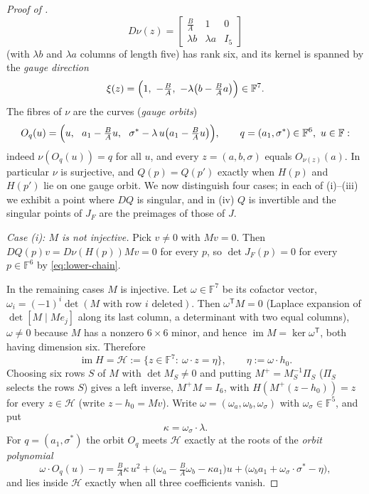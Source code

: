 \begin{proof}[Proof of ]
\[
   D\nu(z)=\begin{bmatrix} \tfrac BA & 1 & 0\\[2pt] \lambda b & \lambda a & I_5\end{bmatrix}
\]
(with $\lambda b$ and $\lambda a$ columns of length five) has rank six, and its kernel is
spanned by the \emph{gauge direction}
\[
   \xi(z)=\Bigl(1,\ -\tfrac BA,\ -\lambda\bigl(b-\tfrac BAa\bigr)\Bigr)\in\mathbb{F}^7 .
\]
The fibres of $\nu$ are the curves (\emph{gauge orbits})
\[
   O_q(u)=\Bigl(u,\ \ a_1-\tfrac BAu,\ \ \sigma^*-\lambda\,u\bigl(a_1-\tfrac BAu\bigr)\Bigr),
   \qquad q=(a_1,\sigma^*)\in\mathbb{F}^6,\ u\in\mathbb{F}:
\]
indeed $\nu(O_q(u))=q$ for all $u$, and every $z=(a,b,\sigma)$ equals $O_{\nu(z)}(a)$.
In particular $\nu$ is surjective, and $Q(p)=Q(p')$ exactly when $H(p)$ and $H(p')$
lie on one gauge orbit.  We now distinguish four cases; in each of (i)--(iii) we exhibit
a point where $DQ$ is singular, and in (iv) $Q$ is invertible and the singular points of
$J_F$ are the preimages of those of $J$.

\smallskip
\noindent\textit{Case (i): $M$ is not injective.}
Pick $v\neq0$ with $Mv=0$.  Then $DQ(p)v=D\nu(H(p))Mv=0$ for every $p$, so
$\det J_F(p)=0$ for every $p\in\mathbb{F}^6$ by \eqref{eq:lower-chain}.

In the remaining cases $M$ is injective.  Let $\omega\in\mathbb{F}^7$ be its cofactor
vector, $\omega_i=(-1)^i\det(M\text{ with row $i$ deleted})$.  Then
$\omega^{\mathsf T}M=0$ (Laplace expansion of $\det[M\mid Me_j]$ along its last column,
a determinant with two equal columns), $\omega\neq0$ because $M$ has a nonzero
$6\times6$ minor, and hence $\operatorname{im}M=\ker\omega^{\mathsf T}$, both having
dimension six.  Therefore
\[
   \operatorname{im}H=\mathcal{H}:=\{z\in\mathbb{F}^7:\ \omega\cdot z=\eta\},\qquad
   \eta:=\omega\cdot h_0 .
\]
Choosing six rows $S$ of $M$ with $\det M_S\neq0$ and putting $M^+=M_S^{-1}\Pi_S$
($\Pi_S$ selects the rows $S$) gives a left inverse, $M^+M=I_6$, with
$H(M^+(z-h_0))=z$ for every $z\in\mathcal{H}$ (write $z-h_0=Mv$).  Write
$\omega=(\omega_a,\omega_b,\omega_\sigma)$ with $\omega_\sigma\in\mathbb{F}^5$, and put
\[
   \kappa=\omega_\sigma\cdot\lambda .
\]
For $q=(a_1,\sigma^*)$ the orbit $O_q$ meets $\mathcal H$ exactly at the roots of the
\emph{orbit polynomial}
\begin{equation}
\label{eq:lower-orbitpoly}
   \omega\cdot O_q(u)-\eta
   =\tfrac BA\kappa\,u^2+\bigl(\omega_a-\tfrac BA\omega_b-\kappa a_1\bigr)u
    +\bigl(\omega_ba_1+\omega_\sigma\cdot\sigma^*-\eta\bigr),
\end{equation}
and lies inside $\mathcal H$ exactly when all three coefficients vanish.


\end{proof}
